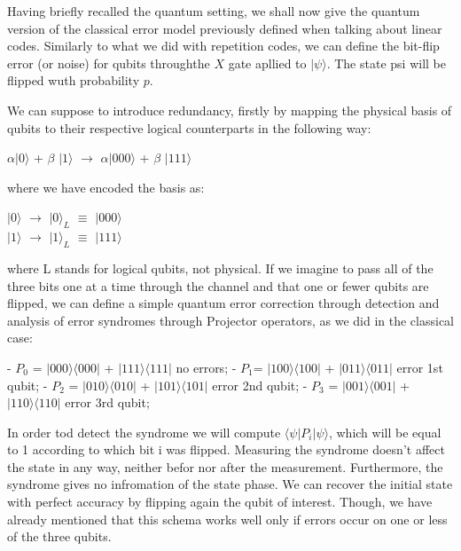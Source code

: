 \documentclass[12pt]{report}
\begin{document}
	
	\begin{minipage}{1 \textwidth}
		
		Having briefly recalled the quantum setting, we shall now give the quantum version of the classical error model previously defined when talking about linear codes.
		Similarly to what we did with repetition codes, we can define the bit-flip error (or noise) for qubits throughthe $X$ gate apllied to $|\psi \rangle$. The state psi will be flipped wuth probability $p$.\newline
		
		We can suppose to introduce redundancy, firstly by mapping the physical basis of qubits to their respective logical counterparts in the following way:
		
		\begin{center}
			$\alpha |0 \rangle$ + $\beta$ $|1 \rangle$ $\rightarrow$ $\alpha |000 \rangle$ + $\beta$ $|111 \rangle$
		\end{center}
		
		where we have encoded the basis as:
		
		\begin{center}
			$|0 \rangle$ $\rightarrow$ $|0 \rangle_L$ $\equiv$ $|000 \rangle$   \\
		    $|1 \rangle$ $\rightarrow$ $|1 \rangle_L$ $\equiv$ $|111 \rangle$
		\end{center}
		
		where L stands for logical qubits, not physical. \newline
		If we imagine to pass all of the three bits one at a time through the channel and that one or fewer qubits are flipped, we can define a simple quantum error correction through detection and analysis of error syndromes through Projector operators, as we did in the classical case:\newline
		
		- $P_0$ = $|000 \rangle \langle 000|$ + $|111 \rangle \langle 111|$ no errors;\newline
		- $P_1$= $|100 \rangle \langle 100|$ + $|011 \rangle \langle 011|$ error 1st qubit;\newline
		- $P_2$ = $|010 \rangle \langle 010|$ + $|101 \rangle \langle 101|$ error 2nd qubit;\newline
		- $P_3$ = $|001 \rangle \langle 001|$ + $|110 \rangle \langle 110|$ error 3rd qubit;\newline
		
		In order tod detect the syndrome we will compute $\langle \psi| P_i | \psi \rangle $, which will be equal to 1 according to which bit i was flipped.
		Measuring the syndrome doesn't affect the state in any way, neither befor nor after the measurement. Furthermore, the syndrome gives no infromation of the state phase. We can recover the initial state with perfect accuracy by flipping again the qubit of interest.\newline
		Though, we have already mentioned that this schema works well only if errors occur on one or less of the three qubits.\newline
		

\end{minipage}
\end{document}
